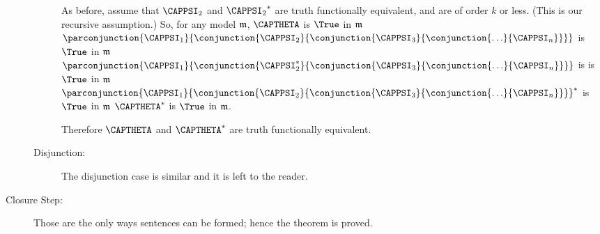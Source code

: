 \begin{PROOF}
\begin{description}
\begin{description}
As before, assume that $\CAPPSI_2$ and ${\CAPPSI_2}^*$ are truth functionally equivalent, and are of order $k$ or less. 
(This is our recursive assumption.)
So, for any model $\mathfrak{m}$, $\CAPTHETA$ is $\True$ in $\mathfrak{m}$ \Iff $\parconjunction{\CAPPSI_1}{\conjunction{\CAPPSI_2}{\conjunction{\CAPPSI_3}{\conjunction{\ldots}{\CAPPSI_{\integer{n}}}}}}$ is $\True$ in $\mathfrak{m}$ \Iff $\parconjunction{\CAPPSI_1}{\conjunction{\CAPPSI_2^*}{\conjunction{\CAPPSI_3}{\conjunction{\ldots}{\CAPPSI_{\integer{n}}}}}}$ is is $\True$ in $\mathfrak{m}$ \Iff $\parconjunction{\CAPPSI_1}{\conjunction{\CAPPSI_2}{\conjunction{\CAPPSI_3}{\conjunction{\ldots}{\CAPPSI_{\integer{n}}}}}}^*$ is $\True$ in $\mathfrak{m}$ \Iff $\CAPTHETA^*$ is $\True$ in $\mathfrak{m}$.

Therefore $\CAPTHETA$ and $\CAPTHETA^*$ are truth functionally equivalent.

\item[Disjunction:] The disjunction case is similar and it is left to the reader. 
\end{description}
\item[Closure Step:] Those are the only ways \GSL{} sentences can be formed; hence the theorem is proved.
\end{description}
\end{PROOF}
